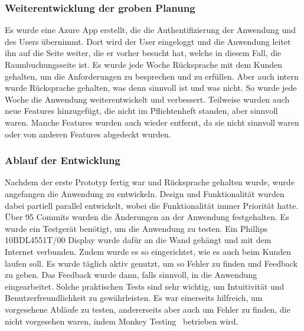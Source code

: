 \subsubsection{Weiterentwicklung der groben Planung}
Es wurde eine Azure App erstellt, die die Authentifizierung der Anwendung und des Users übernimmt.
\newline
Dort wird der User eingeloggt und die Anwendung leitet ihn auf die Seite weiter, die er vorher besucht hat, welche in diesem Fall, die Raumbuchungsseite ist.
\newline
Es wurde jede Woche Rücksprache mit dem Kunden gehalten, um die Anforderungen zu besprechen und zu erfüllen.
Aber auch intern wurde Rücksprache gehalten, was denn sinnvoll ist und was nicht.
\newline
So wurde jede Woche die Anwendung weiterentwickelt und verbessert.
Teilweise wurden auch neue Features hinzugefügt, die nicht im Pflichtenheft standen, aber sinnvoll waren.
Manche Features wurden auch wieder entfernt, da sie nicht sinnvoll waren oder von anderen Features abgedeckt wurden.
\newline
\newline
\subsubsection{Ablauf der Entwicklung}
Nachdem der erste Prototyp fertig war und Rücksprache gehalten wurde, wurde angefangen die Anwendung zu entwickeln.
Design und Funktionalität wurden dabei partiell parallel entwickelt, wobei die Funktionalität immer Priorität hatte.
Über 95 Commits wurden die Änderungen an der Anwendung festgehalten.
\newline
Es wurde ein Testgerät benötigt, um die Anwendung zu testen.
Ein Phillips 10BDL4551T/00 Display wurde dafür an die Wand gehängt und mit dem Internet verbunden.
Zudem wurde es so eingerichtet, wie es auch beim Kunden laufen soll.
\newline
Es wurde täglich aktiv genutzt, um so Fehler zu finden und Feedback zu geben.
Das Feedback wurde dann, falls sinnvoll, in die Anwendung eingearbeitet.
Solche praktischen Tests sind sehr wichtig, um Intuitivität und Benutzerfreundlichkeit zu gewährleisten.
Es war einerseits hilfreich, um vorgesehene Abläufe zu testen, andererseits aber auch um Fehler zu finden, die nicht vorgesehen waren, indem Monkey Testing~\cite{Monkey-Testing-Book1} betrieben wird.
\newline
